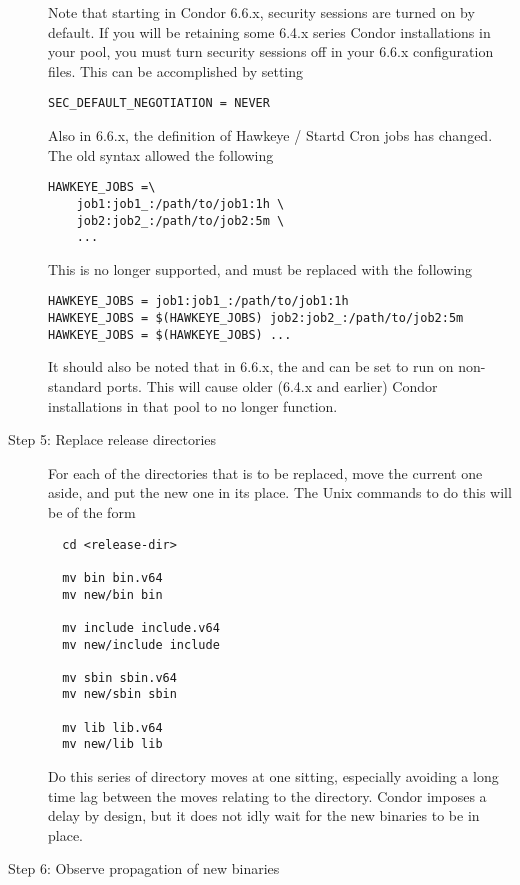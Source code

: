 \begin{description}
Note that starting in Condor 6.6.x, security sessions are turned on by
default. If you will be retaining some 6.4.x series Condor installations
in your pool, you must turn security sessions off in your 6.6.x
configuration files. This can be accomplished by setting

\begin{verbatim}
SEC_DEFAULT_NEGOTIATION = NEVER
\end{verbatim}

Also in 6.6.x, the definition of Hawkeye / Startd Cron jobs has
changed. The old syntax allowed the following

\begin{verbatim}
HAWKEYE_JOBS =\
	job1:job1_:/path/to/job1:1h \
	job2:job2_:/path/to/job2:5m \
	...
\end{verbatim}

This is no longer supported, and must be replaced with the following

\begin{verbatim}
HAWKEYE_JOBS = job1:job1_:/path/to/job1:1h
HAWKEYE_JOBS = $(HAWKEYE_JOBS) job2:job2_:/path/to/job2:5m
HAWKEYE_JOBS = $(HAWKEYE_JOBS) ...
\end{verbatim}

It should also be noted that in 6.6.x, the  and
 can be set to run on non-standard ports. This will
cause older (6.4.x and earlier) Condor installations in that pool to no
longer function.


\item[Step 5:  Replace release directories]
For each of the directories that is to be replaced,
move the current one aside, and put the new one in its place.
The Unix commands to do this will be of the form
\begin{verbatim}
  cd <release-dir>

  mv bin bin.v64
  mv new/bin bin

  mv include include.v64
  mv new/include include

  mv sbin sbin.v64
  mv new/sbin sbin

  mv lib lib.v64
  mv new/lib lib
\end{verbatim}

Do this series of directory moves at one
sitting, especially avoiding a long time lag between the moves
relating to the  directory.
Condor imposes a delay by design, but it does not idly wait for the
new binaries to be in place.

\item[Step 6:  Observe propagation of new binaries]


\end{description}
